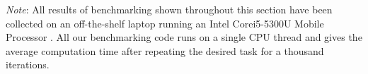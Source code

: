%
\textcolor{changed}{\emph{Note}: All results of benchmarking shown throughout this section
have been collected on an off-the-shelf laptop running an Intel\textregistered
Core\texttrademark i5-5300U Mobile Processor \citep{intel:5300u}.
All our benchmarking code runs on a single CPU thread and gives the average
computation time after repeating the desired task for a thousand iterations.
}
\\

